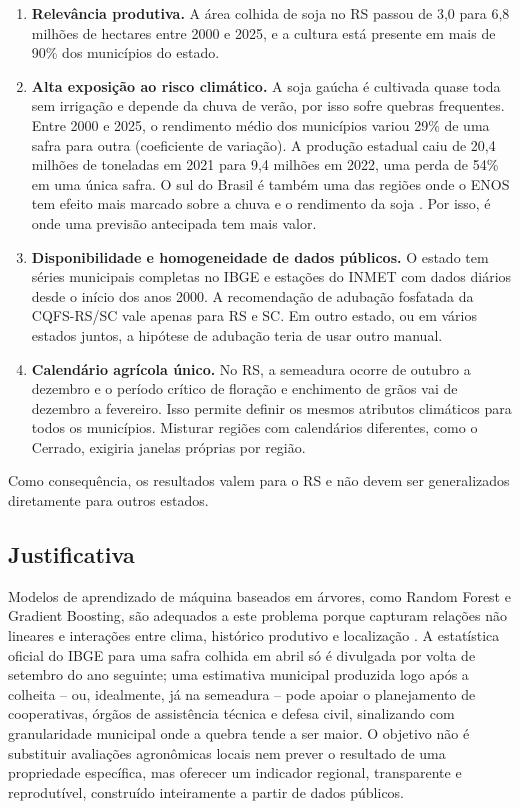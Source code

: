 \documentclass[12pt]{article}
\begin{document}
\begin{enumerate}
  \item \textbf{Relevância produtiva.} A área colhida de soja no RS passou
    de 3,0 para 6,8 milhões de hectares entre 2000 e 2025, e a cultura está
    presente em mais de 90\% dos municípios do estado.
  \item \textbf{Alta exposição ao risco climático.} A soja gaúcha é
    cultivada quase toda sem irrigação e depende da chuva de verão, por
    isso sofre quebras frequentes. Entre 2000 e 2025, o rendimento médio dos municípios
    variou 29\% de uma safra para outra (coeficiente de variação). A
    produção estadual caiu de 20,4 milhões de toneladas em 2021 para 9,4
    milhões em 2022, uma perda de 54\% em uma única safra. O sul do Brasil
    é também uma das regiões onde o ENOS tem efeito mais marcado sobre a
    chuva e o rendimento da soja \cite{noia2020,pilau2022}. Por isso, é onde uma
    previsão antecipada tem mais valor.
  \item \textbf{Disponibilidade e homogeneidade de dados públicos.} O
    estado tem séries municipais completas no IBGE e estações do INMET
    com dados diários desde o início dos anos 2000. A recomendação de
    adubação fosfatada da CQFS-RS/SC \cite{sbcs2016} vale apenas para RS e
    SC. Em outro estado, ou em vários estados juntos, a hipótese de
    adubação teria de usar outro manual.
  \item \textbf{Calendário agrícola único.} No RS, a semeadura ocorre de
    outubro a dezembro e o período crítico de floração e enchimento de
    grãos vai de dezembro a fevereiro. Isso permite definir os mesmos
    atributos climáticos para todos os municípios. Misturar regiões com
    calendários diferentes, como o Cerrado, exigiria janelas próprias por
    região.
\end{enumerate}

\noindent Como consequência, os resultados valem para o RS e não devem ser
generalizados diretamente para outros estados.

\subsection{Justificativa}

Modelos de aprendizado de máquina baseados em árvores, como Random Forest e
Gradient Boosting, são adequados a este problema porque capturam relações
não lineares e interações entre clima, histórico produtivo e localização
\cite{jeong2016,vanklompenburg2020}. A estatística oficial do IBGE para uma
safra colhida em abril só é divulgada por volta de setembro do ano
seguinte; uma estimativa municipal produzida logo após a colheita -- ou, idealmente, já na
semeadura -- pode apoiar o planejamento de cooperativas, órgãos de
assistência técnica e defesa civil, sinalizando com granularidade municipal
onde a quebra tende a ser maior. O objetivo não é substituir avaliações
agronômicas locais nem prever o resultado de uma propriedade específica, mas
oferecer um indicador regional, transparente e reprodutível, construído
inteiramente a partir de dados públicos.
\end{document}
